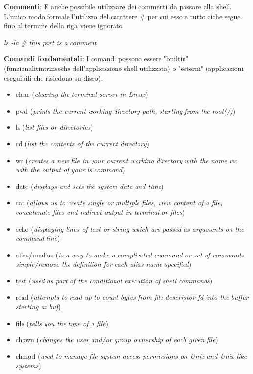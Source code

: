 \begin{flushleft}
  \textbf{Commenti}: \ac{E} anche possibile utilizzare dei commenti da passare alla shell. L'unico modo formale 
  \ace l'utilizzo del carattere \# per cui esso e tutto ci\aco che segue fino al termine della riga viene ignorato
  \begin{flushleft}
    \textit{ls -la \# this part is a comment}
  \end{flushleft} 
\end{flushleft}
\begin{flushleft}
  \textbf{Comandi fondamentali}: I comandi possono essere "builtin" (funzionalit\aca intrinseche dell'applicazione 
  shell utilizzata) o "esterni" (applicazioni eseguibili che risiedono su disco).
  \begin{itemize}
    \item clear (\textit{clearing the terminal screen in Linux})
    \item pwd (\textit{prints the current working directory path, starting from the root(/)})
    \item ls  (\textit{list files or directories})
    \item cd (\textit{list the contents of the current directory})
    \item wc (\textit{creates a new file in your current working directory with the name wc with the output of your ls command})
    \item date (\textit{displays and sets the system date and time})
    \item cat (\textit{allows us to create single or multiple files, view content of a file, concatenate files and redirect output in terminal or files})
    \item echo (\textit{displaying lines of text or string which are passed as arguments on the command line})
    \item alias/unalias (\textit{is a way to make a complicated command or set of commands simple/remove the definition for each alias name specified})
    \item test (\textit{used as part of the conditional execution of shell commands})
    \item read (\textit{attempts to read up to count bytes from file descriptor fd into the buffer starting at buf})
    \item file (\textit{tells you the type of a file})
    \item chown (\textit{changes the user and/or group ownership of each given file})
    \item chmod (\textit{used to manage file system access permissions on Unix and Unix-like systems})

\end{itemize}
\end{flushleft}
